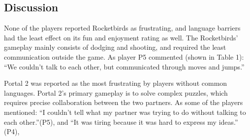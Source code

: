\subsection{Discussion}

None of the players reported Rocketbirds as frustrating, and language barriers had the least effect on its fun and enjoyment rating as well.
The Rocketbirds' gameplay mainly consists of dodging and shooting, and required the least communication outside the game. As player P5 commented (shown in Table 1): ``We couldn't talk to each other, but communicated through moves and jumps.'' 
 



Portal 2 was reported as the most frustrating by players without common languages. Portal 2's primary gameplay is to solve complex puzzles, which requires precise collaboration between the two partners. As some of the players mentioned: ``I couldn't tell what my partner was trying to do without talking to each other.''(P5), and ``It was tiring because it was hard to express my ideas.'' (P4),



